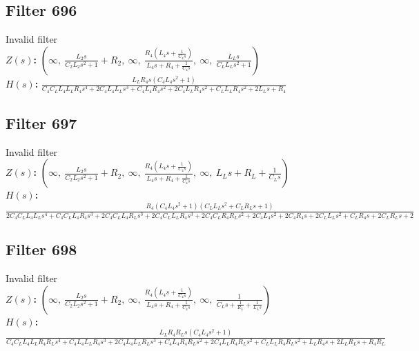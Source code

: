 \documentclass{article}
\begin{document}
\subsection*{Filter 696}
Invalid filter \\ 
\textbf{$Z(s)$:} $\left( \infty, \  \frac{L_{2} s}{C_{2} L_{2} s^{2} + 1} + R_{2}, \  \infty, \  \frac{R_{4} \left(L_{4} s + \frac{1}{C_{4} s}\right)}{L_{4} s + R_{4} + \frac{1}{C_{4} s}}, \  \infty, \  \frac{L_{L} s}{C_{L} L_{L} s^{2} + 1}\right)$ \\ 
\textbf{$H(s)$:} $\frac{L_{L} R_{4} s \left(C_{4} L_{4} s^{2} + 1\right)}{C_{4} C_{L} L_{4} L_{L} R_{4} s^{4} + 2 C_{4} L_{4} L_{L} s^{3} + C_{4} L_{4} R_{4} s^{2} + 2 C_{4} L_{L} R_{4} s^{2} + C_{L} L_{L} R_{4} s^{2} + 2 L_{L} s + R_{4}}$ \\ 
\subsection*{Filter 697}
Invalid filter \\ 
\textbf{$Z(s)$:} $\left( \infty, \  \frac{L_{2} s}{C_{2} L_{2} s^{2} + 1} + R_{2}, \  \infty, \  \frac{R_{4} \left(L_{4} s + \frac{1}{C_{4} s}\right)}{L_{4} s + R_{4} + \frac{1}{C_{4} s}}, \  \infty, \  L_{L} s + R_{L} + \frac{1}{C_{L} s}\right)$ \\ 
\textbf{$H(s)$:} $\frac{R_{4} \left(C_{4} L_{4} s^{2} + 1\right) \left(C_{L} L_{L} s^{2} + C_{L} R_{L} s + 1\right)}{2 C_{4} C_{L} L_{4} L_{L} s^{4} + C_{4} C_{L} L_{4} R_{4} s^{3} + 2 C_{4} C_{L} L_{4} R_{L} s^{3} + 2 C_{4} C_{L} L_{L} R_{4} s^{3} + 2 C_{4} C_{L} R_{4} R_{L} s^{2} + 2 C_{4} L_{4} s^{2} + 2 C_{4} R_{4} s + 2 C_{L} L_{L} s^{2} + C_{L} R_{4} s + 2 C_{L} R_{L} s + 2}$ \\ 
\subsection*{Filter 698}
Invalid filter \\ 
\textbf{$Z(s)$:} $\left( \infty, \  \frac{L_{2} s}{C_{2} L_{2} s^{2} + 1} + R_{2}, \  \infty, \  \frac{R_{4} \left(L_{4} s + \frac{1}{C_{4} s}\right)}{L_{4} s + R_{4} + \frac{1}{C_{4} s}}, \  \infty, \  \frac{1}{C_{L} s + \frac{1}{R_{L}} + \frac{1}{L_{L} s}}\right)$ \\ 
\textbf{$H(s)$:} $\frac{L_{L} R_{4} R_{L} s \left(C_{4} L_{4} s^{2} + 1\right)}{C_{4} C_{L} L_{4} L_{L} R_{4} R_{L} s^{4} + C_{4} L_{4} L_{L} R_{4} s^{3} + 2 C_{4} L_{4} L_{L} R_{L} s^{3} + C_{4} L_{4} R_{4} R_{L} s^{2} + 2 C_{4} L_{L} R_{4} R_{L} s^{2} + C_{L} L_{L} R_{4} R_{L} s^{2} + L_{L} R_{4} s + 2 L_{L} R_{L} s + R_{4} R_{L}}$ \\ 
\end{document}
